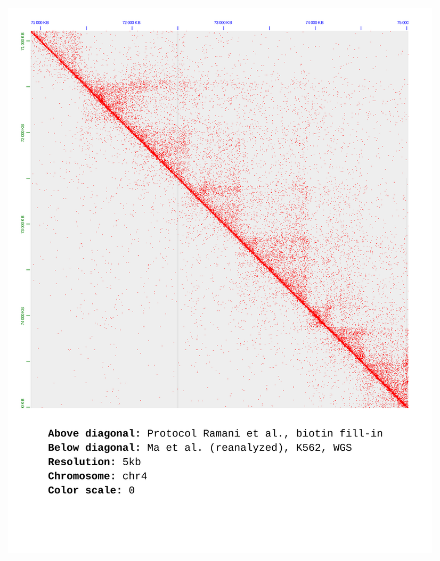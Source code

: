 \documentclass[a4paper,14pt]{extarticle}
\begin{document}
\begin{figure}[hp!] \includegraphics[width=1\textwidth]{ma-wgs_s30_chr4_5kb_0.pdf} \end{figure}
\end{document}
